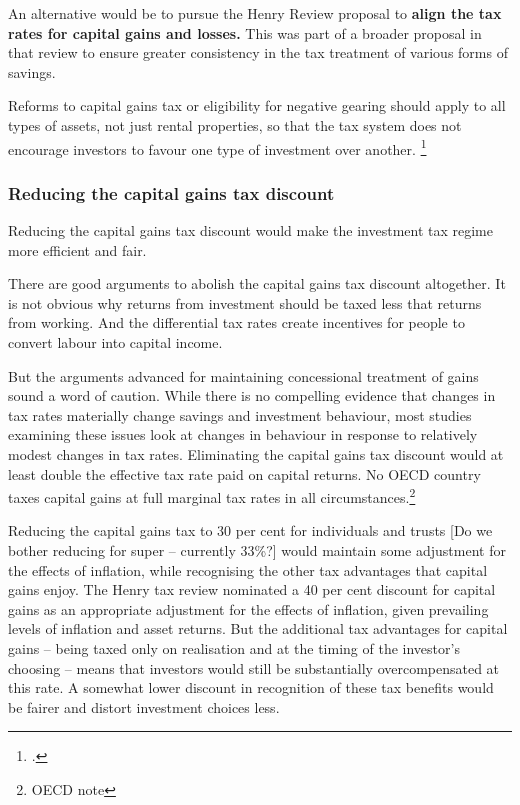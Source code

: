 \documentclass{grattan}\usepackage[]{graphicx}\usepackage[]{color}
\newcommand{\highlight}[1]{\textbf{#1}}
\begin{document}
An alternative would be to pursue the Henry Review proposal to \highlight{align the tax rates for capital gains and losses.} This was part of a broader proposal in that review to ensure greater consistency in the tax treatment of various forms of savings.

Reforms to capital gains tax or eligibility for negative gearing should apply to all types of assets, not just rental properties, so that the tax system does not encourage investors to favour one type of investment over another.  \footcite[p.~133]{Commission2004}

\subsubsection{Reducing the capital gains tax discount}
Reducing the capital gains tax discount would make the investment tax regime more efficient and fair. 

There are good arguments to abolish the capital gains tax discount altogether. It is not obvious why returns from investment should be taxed less that returns from working. And the differential tax rates create incentives for people to convert labour into capital income. 

But the arguments advanced for maintaining concessional treatment of gains sound a word of caution. While there is no compelling evidence that changes in tax rates materially change savings and investment behaviour, most studies examining these issues look at changes in behaviour in response to relatively modest changes in tax rates. Eliminating the capital gains tax discount would at least double the effective tax rate paid on capital returns. No OECD country taxes capital gains at full marginal tax rates in all circumstances.\footnote{OECD note} 

Reducing the capital gains tax to 30 per cent for individuals and trusts [Do we bother reducing for super -- currently 33\%?] would maintain some adjustment for the effects of inflation, while recognising the other tax advantages that capital gains enjoy. The Henry tax review nominated a 40 per cent discount for capital gains as an appropriate adjustment for the effects of inflation, given prevailing levels of inflation and asset returns.  But the additional tax advantages for capital gains -- being taxed only on realisation and at the timing of the investor's choosing -- means that investors would still be substantially overcompensated at this rate. A somewhat lower discount in recognition of these tax benefits would be fairer and distort investment choices less. 
\end{document}
